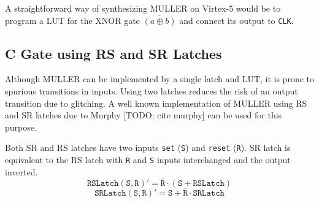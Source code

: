 A straightforward way of synthesizing MULLER on Virtex-5 would be to program
a LUT for the XNOR gate $\overline{(a \oplus b)}$ and connect its output to
\texttt{CLK}.

\subsection{C Gate using RS and SR Latches}

Although MULLER can be implemented by a single latch and LUT, it is prone
to spurious transitions in inputs. 
Using two latches reduces the risk of an output transition due to glitching.
A well known implementation of MULLER using RS and SR latches due to Murphy
[TODO: cite murphy] can be used for this purpose.

Both SR and RS latches have two inputs \texttt{set} (\texttt{S}) and
\texttt{reset} (\texttt{R}). 
SR latch is equivalent to the RS latch with \texttt{R} and \texttt{S} inputs
interchanged and the output inverted.
\begin{equation}\label{eq:rslatch}
	\texttt{RSLatch}(\texttt{S},\texttt{R})' 
	= \overline{\texttt{R}} \cdot (\texttt{S} + \texttt{RSLatch})
\end{equation}
\begin{equation}\label{eq:srlatch}
	\texttt{SRLatch}(\texttt{S},\texttt{R})' 
	= \texttt{S} + \overline{\texttt{R}} \cdot \texttt{SRLatch}
\end{equation}

